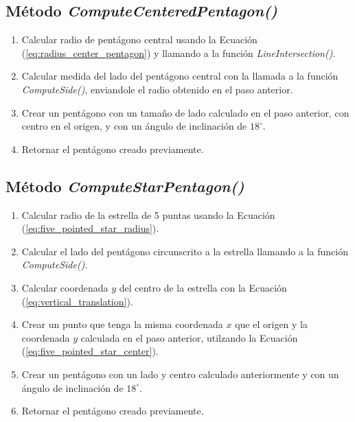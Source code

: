 \documentclass[oneside, a4paper]{article}
\begin{document}
        \subsection{Método \textit{ComputeCenteredPentagon()}}

            \begin{enumerate}
                \item Calcular radio de pentágono central usando la Ecuación (\ref{eq:radius_center_pentagon}) y llamando a la función \textit{LineIntersection()}.
                \item Calcular medida del lado del pentágono central con la llamada a la función \textit{ComputeSide()}, enviandole el radio obtenido en el paso anterior.
                \item Crear un pentágono con un tamaño de lado calculado en el paso anterior, con centro en el origen, y con un ángulo de inclinación de $18^{\circ}$.
                \item Retornar el pentágono creado previamente.
            \end{enumerate}

        \subsection{Método \textit{ComputeStarPentagon()}}

            \begin{enumerate}
                \item Calcular radio de la estrella de 5 puntas usando la Ecuación (\ref{eq:five_pointed_star_radius}).
                \item Calcular el lado del pentágono circunscrito a la estrella llamando a la función \textit{ComputeSide()}.
                \item Calcular coordenada $y$ del centro de la estrella con la Ecuación (\ref{eq:vertical_translation}).
                \item Crear un punto que tenga la misma coordenada $x$ que el origen y la coordenada $y$ calculada en el paso anterior, utilzando la Ecuación (\ref{eq:five_pointed_star_center}).
                \item Crear un pentágono con un lado y centro calculado anteriormente y con un ángulo de inclinación de $18^{\circ}$.
                \item Retornar el pentágono creado previamente.
            \end{enumerate}
\end{document}
